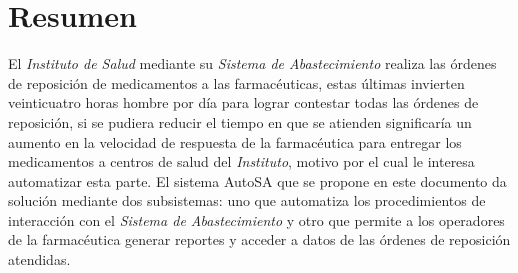 \section{Resumen}
El \textit{Instituto de Salud} mediante su \textit{Sistema de Abastecimiento} realiza las órdenes de reposición de medicamentos a las farmacéuticas, estas últimas invierten veinticuatro horas hombre por día para lograr contestar todas las órdenes de reposición, si se pudiera reducir el tiempo en que se atienden significaría un aumento en la velocidad de respuesta de la farmacéutica para entregar los medicamentos a centros de salud del \textit{Instituto}, motivo por el cual le interesa automatizar esta parte. El sistema AutoSA que se propone en este documento da solución mediante dos subsistemas: uno que automatiza los procedimientos de interacción con el \textit{Sistema de Abastecimiento} y otro que permite a los operadores de la farmacéutica generar reportes y acceder a datos de las órdenes de reposición atendidas.